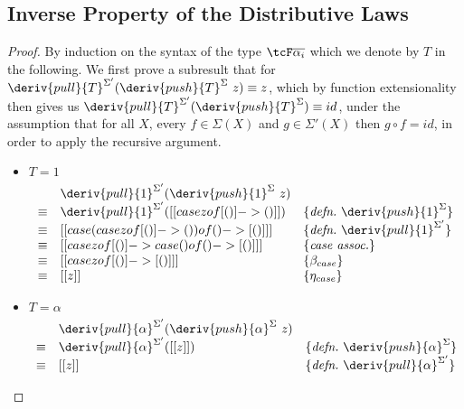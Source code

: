 \subsection{Inverse Property of the Distributive Laws}
\label{proof:inverse-proofs}

\pushPullInverse*

\begin{proof}
By induction on the syntax of the type $\tcF \overline{\alpha_i}$ which we denote
by $T$ in the following. We first prove a subresult that for
$\deriv{pull}{T}^{\Sigma'}(\deriv{push}{T}^\Sigma \ z) \equiv z$, which by
function extensionality then gives us
$\deriv{pull}{T}^{\Sigma'}(\deriv{push}{T}^\Sigma) \equiv id$,
under the assumption that for all $X$, every $f \in \Sigma(X)$ and $g \in
\Sigma'(X)$ then $g \circ f = id$, in order to apply the recursive argument.
%
\begin{itemize}
\item $T = 1$
%
\begin{align*}
\begin{array}{rll}
       & \deriv{pull}{1}^{\Sigma'}(\deriv{push}{1}^\Sigma \ z) & \\
%
\equiv & \deriv{pull}{1}^{\Sigma'}([[ case z of [ () ] -> () ]])
& \{\textit{defn.}\ \deriv{push}{1}^\Sigma \} \\
%
\equiv & [[ case (case z of [ () ] -> () ) of () -> [ () ] ]]
& \{\textit{defn.}\ \deriv{pull}{1}^{\Sigma'}\} \\
%
\equiv & [[ case z of [()] -> case () of () -> [ () ] ]]
& \{\textit{case assoc.}\} \\
%
\equiv & [[ case z of [()] -> [ () ] ]]
& \{\beta_{case}\} \\
%
\equiv & [[ z ]]
& \{\textit{$\eta_{case}$}\}
\end{array}
\end{align*}
%

\item $T = \alpha$
%
\begin{align*}
\begin{array}{rll}
       & \deriv{pull}{\alpha}^{\Sigma'}(\deriv{push}{\alpha}^\Sigma \ z) & \\
%
\equiv & \deriv{pull}{\alpha}^{\Sigma'}([[ z ]])
& \{\textit{defn.}\ \deriv{push}{\alpha}^\Sigma  \} \\
%
\equiv & [[ z ]] & \{\textit{defn.}\ \deriv{pull}{\alpha}^{\Sigma'} \}
\end{array}
\end{align*}


\end{itemize}
\end{proof}
